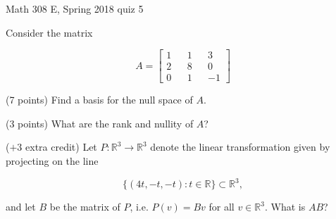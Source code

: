 \documentclass{exam}
\begin{document}
 
\begin{center} \begin{Large} Math 308 E, Spring 2018 quiz 5 \end{Large}
\end{center} 

\vspace{5mm}

\begin{center}
\end{center}

\vspace{1cm}
 

\vspace{1cm}

Consider the matrix 

\[
A = \begin{bmatrix} 1 && 1 && 3 \\ 2 && 8 && 0 \\ 0 && 1 && -1 \end{bmatrix}
\]

\begin{questions}
\question (7 points) Find a basis for the null space of $A$. 

\vfill

\question (3 points) What are the rank and nullity of $A$?

\vfill 

\question($+3$ extra credit) Let $P:\mathbb{R}^3 \to \mathbb{R}^3$ denote the linear transformation given by projecting on the line 

\[
\{(4t, -t, -t): t \in \mathbb{R}\} \subset \mathbb{R}^3,
\]

and let $B$ be the matrix of $P$, i.e. $P(v) = Bv$ for all $v \in \mathbb{R}^3$. What is $AB$? 

\vfill

\end{questions}
\end{document}
